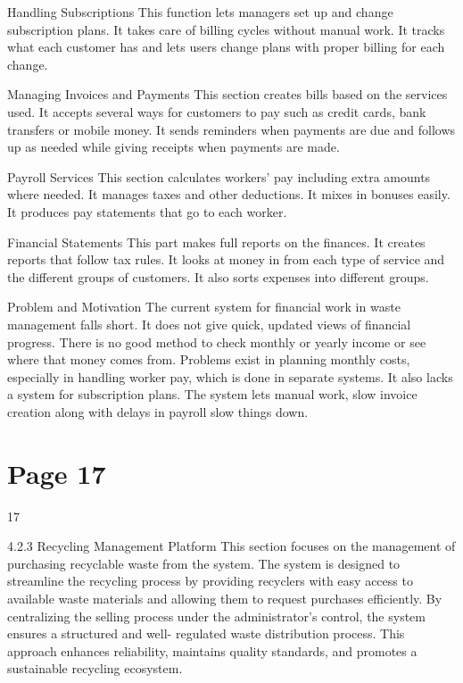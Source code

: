 \documentclass{article}
\begin{document}
Handling Subscriptions 
This function lets managers set up and change subscription plans. It takes care of billing cycles 
without manual work. It tracks what each customer has and lets users change plans with proper 
billing for each change. 
 
Managing Invoices and Payments 
This section creates bills based on the services used. It accepts several ways for customers to 
pay such as credit cards, bank transfers or mobile money. It sends reminders when payments 
are due and follows up as needed while giving receipts when payments are made. 
 
Payroll Services 
This section calculates workers' pay including extra amounts where needed. It manages taxes 
and other deductions. It mixes in bonuses easily. It produces pay statements that go to each 
worker. 
 
Financial Statements 
This part makes full reports on the finances. It creates reports that follow tax rules. It looks at 
money in from each type of service and the different groups of customers. It also sorts 
expenses into different groups. 
 
Problem and Motivation 
The current system for financial work in waste management falls short. It does not give quick, 
updated views of financial progress. There is no good method to check monthly or yearly 
income or see where that money comes from. Problems exist in planning monthly costs, 
especially in handling worker pay, which is done in separate systems. It also lacks a system for 
subscription plans. The system lets manual work, slow invoice creation along with delays in 
payroll slow things down. 

\section*{Page 17}
   
 
 17  
 
4.2.3 Recycling Management Platform 
This section focuses on the management of purchasing recyclable waste from the system. The 
system is designed to streamline the recycling process by providing recyclers with easy access 
to available waste materials and allowing them to request purchases efficiently. By centralizing 
the selling process under the administrator’s control, the system ensures a structured and well-
regulated waste distribution process. This approach enhances reliability, maintains quality 
standards, and promotes a sustainable recycling ecosystem. 
 
\end{document}
